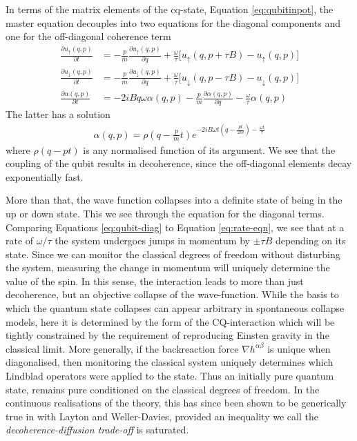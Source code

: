 \documentclass[aps,pra,showpacs,citeautoscript,amsmath,amssymb,floatfix,superscriptaddress,bbm, verbatim,amsfonts,changes,10pt,nofootinbib,longbibliography]{revtex4-1}
\def\u{u}
\def\ab{^{\alpha\beta}}
\def\down{\downarrow}
\def\up{\uparrow}
\begin{document}
In terms of the matrix elements of the cq-state, Equation \eqref{eq:qubitinpot}, the master equation decouples into two equations for the diagonal components and one for  the off-diagonal coherence term
\begin{align}
\frac{\partial\u_\up(q,p)}{\partial t} & =-\frac{p}{m} 
 \frac{\partial\u_\up(q,p)}{\partial q}
 +\frac{\omega}{\tau}\big[
 \u_\up(q,p+\tau B)-\u_\up(q,p)\big]
\nonumber\\
 \frac{\partial\u_\down(q,p)}{\partial t} & =-\frac{p}{m} 
 \frac{\partial\u_\down(q,p)}{\partial q}
 +\frac{\omega}{\tau}\big[
 \u_\down(q,p-\tau B)-\u_\down(q,p)\big] 
  \label{eq:qubit-diag}\\
 \frac{\partial\alpha(q,p)}{\partial t} &=
-2iBq\omega\alpha(q,p) 
 -\frac{p}{m} 
 \frac{\partial\alpha(q,p)}{\partial q}
 -\frac{\omega}{\tau}\alpha(q,p)
 \label{eq:qubit-offdiags}
\end{align}
The latter has a solution
\begin{align}
\alpha(q,p)=\rho(q-\frac{p}{m}t)e^{-2iB\omega t(q-\frac{pt}{2m}) -\frac{\omega t}{\tau}}
\end{align}
where $\rho(q-pt)$ is any normalised function of its argument. We see that the coupling of the qubit results in decoherence, since the off-diagonal elements decay exponentially fast. 

More than that, the wave function collapses into a definite state of being in the up or down state.
This we see through the equation for the diagonal terms. Comparing Equations \eqref{eq:qubit-diag} to Equation \eqref{eq:rate-eqn}, we see that at a rate of $\omega/\tau$ the system undergoes jumps in momentum by $\pm\tau B$ depending on its state.  Since we can monitor the classical degrees of freedom without disturbing the system, measuring the change in momentum will uniquely determine the value of the spin. In this sense, the interaction leads to more than just decoherence, but an objective collapse of the wave-function\cite{shimony1990desiderata,sep-qm-collapse}. 
While the basis to which the quantum state collapses can appear arbitrary in spontaneous collapse models, here it is determined by the form of the CQ-interaction which will be tightly constrained by the requirement of reproducing Einsten gravity in the classical limit. More generally, if the backreaction force $\nabla h\ab$ %
is unique when  diagonalised, then monitoring the classical system uniquely determines which Lindblad operators were applied to the state. Thus an initially pure quantum state, remains pure conditioned on the classical degrees of freedom. In the continuous realisations of the theory, this has since been shown to be generically true in \cite{layton2022semi} with Layton and Weller-Davies, provided an inequality we call the {\it decoherence-diffusion trade-off} is saturated.\label{ft:unique}
\end{document}
